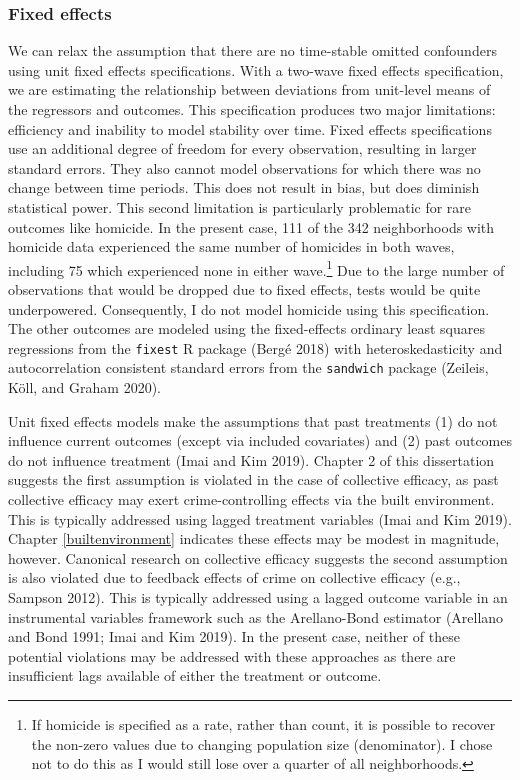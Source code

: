 \documentclass [11pt, proquest] {uwthesis}[2015/03/03]
\begin{document}
\hypertarget{fixed-effects}{%
\subsubsection{Fixed effects}\label{fixed-effects}}

We can relax the assumption that there are no time-stable omitted confounders using unit fixed effects specifications. With a two-wave fixed effects specification, we are estimating the relationship between deviations from unit-level means of the regressors and outcomes. This specification produces two major limitations: efficiency and inability to model stability over time. Fixed effects specifications use an additional degree of freedom for every observation, resulting in larger standard errors. They also cannot model observations for which there was no change between time periods. This does not result in bias, but does diminish statistical power. This second limitation is particularly problematic for rare outcomes like homicide. In the present case, 111 of the 342 neighborhoods with homicide data experienced the same number of homicides in both waves, including 75 which experienced none in either wave.\footnote{If homicide is specified as a rate, rather than count, it is possible to recover the non-zero values due to changing population size (denominator). I chose not to do this as I would still lose over a quarter of all neighborhoods.} Due to the large number of observations that would be dropped due to fixed effects, tests would be quite underpowered. Consequently, I do not model homicide using this specification. The other outcomes are modeled using the fixed-effects ordinary least squares regressions from the \texttt{fixest} R package (Bergé 2018) with heteroskedasticity and autocorrelation consistent standard errors from the \texttt{sandwich} package (Zeileis, Köll, and Graham 2020).

Unit fixed effects models make the assumptions that past treatments (1) do not influence current outcomes (except via included covariates) and (2) past outcomes do not influence treatment (Imai and Kim 2019). Chapter 2 of this dissertation suggests the first assumption is violated in the case of collective efficacy, as past collective efficacy may exert crime-controlling effects via the built environment. This is typically addressed using lagged treatment variables (Imai and Kim 2019). Chapter \ref{builtenvironment} indicates these effects may be modest in magnitude, however. Canonical research on collective efficacy suggests the second assumption is also violated due to feedback effects of crime on collective efficacy (e.g., Sampson 2012). This is typically addressed using a lagged outcome variable in an instrumental variables framework such as the Arellano-Bond estimator (Arellano and Bond 1991; Imai and Kim 2019). In the present case, neither of these potential violations may be addressed with these approaches as there are insufficient lags available of either the treatment or outcome.
\end{document}
